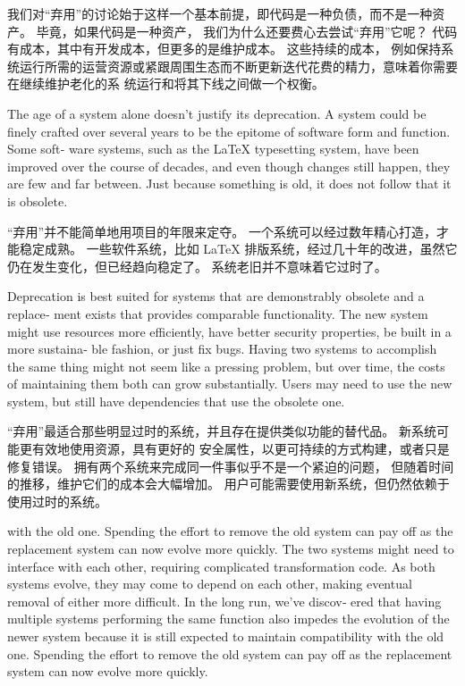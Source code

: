\documentclass[10pt,a4paper,UTF8]{ctexart}
\begin{document}
我们对“弃用”的讨论始于这样一个基本前提，即代码是一种负债，而不是一种资产。 毕竟，如果代码是一种资产，
我们为什么还要费心去尝试“弃用”它呢？ 代码有成本，其中有开发成本，但更多的是维护成本。 这些持续的成本，
例如保持系统运行所需的运营资源或紧跟周围生态而不断更新迭代花费的精力，意味着你需要在继续维护老化的系
统运行和将其下线之间做一个权衡。

The age of a system alone doesn’t justify its deprecation. A system could be finely crafted over
several years to be the epitome of software form and function. Some soft‐ ware systems, such as the
\LaTeX{} typesetting system, have been improved over the course of decades, and even though changes
still happen, they are few and far between. Just because something is old, it does not follow that
it is obsolete.

“弃用”并不能简单地用项目的年限来定夺。 一个系统可以经过数年精心打造，才能稳定成熟。 一些软件系统，比如
\LaTeX{} 排版系统，经过几十年的改进，虽然它仍在发生变化，但已经趋向稳定了。 系统老旧并不意味着它过时了。


Deprecation is best suited for systems that are demonstrably obsolete and a replace‐ ment exists
that provides comparable functionality. The new system might use resources more efficiently, have
better security properties, be built in a more sustaina‐ ble fashion, or just fix bugs. Having two
systems to accomplish the same thing might not seem like a pressing problem, but over time, the
costs of maintaining them both can grow substantially. Users may need to use the new system, but
still have dependencies that use the obsolete one.

“弃用”最适合那些明显过时的系统，并且存在提供类似功能的替代品。 新系统可能更有效地使用资源，具有更好的
安全属性，以更可持续的方式构建，或者只是修复错误。 拥有两个系统来完成同一件事似乎不是一个紧迫的问题，
但随着时间的推移，维护它们的成本会大幅增加。 用户可能需要使用新系统，但仍然依赖于使用过时的系统。

with the old one. Spending the effort to remove the old system can pay off as the replacement system
can now evolve more quickly. The two systems might need to interface with each other, requiring
complicated transformation code. As both systems evolve, they may come to depend on each other,
making eventual removal of either more difficult. In the long run, we’ve discov‐ ered that having
multiple systems performing the same function also impedes the evolution of the newer system because
it is still expected to maintain compatibility with the old one. Spending the effort to remove the
old system can pay off as the replacement system can now evolve more quickly.
\end{document}

